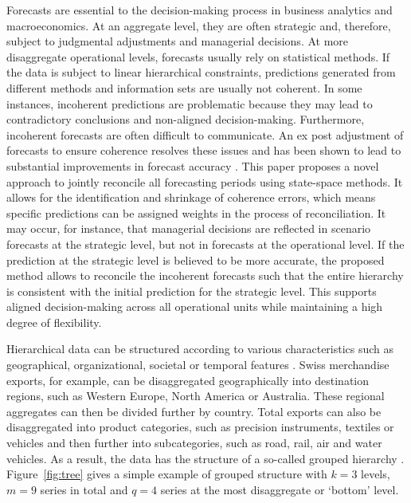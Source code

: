 \documentclass[a4paper,fleqn,11pt]{article}
\begin{document}
Forecasts are essential to the decision-making process in business analytics and macroeconomics. At an aggregate level, they are often strategic and, therefore, subject to judgmental adjustments and managerial decisions. At more disaggregate operational levels, forecasts usually rely on statistical methods. If the data is subject to linear hierarchical constraints, predictions generated from different methods and information sets are usually not coherent. In some instances, incoherent predictions are problematic because they may lead to contradictory conclusions and non-aligned decision-making. Furthermore, incoherent forecasts are often difficult to communicate. An ex post adjustment of forecasts to ensure coherence resolves these issues and has been shown to lead to substantial improvements in forecast accuracy \citep[see][and references therein]{Wickramasuriya2015}. This paper proposes a novel approach to jointly reconcile all forecasting periods using state-space methods. It allows for the identification and shrinkage of coherence errors, which means specific predictions can be assigned weights in the process of reconciliation. It may occur, for instance, that managerial decisions are reflected in scenario forecasts at the strategic level, but not in forecasts at the operational level. If the prediction at the strategic level is believed to be more accurate, the proposed method allows to reconcile the incoherent forecasts such that the entire hierarchy is consistent with the initial prediction for the strategic level. This supports aligned decision-making across all operational units while maintaining a high degree of flexibility.

Hierarchical data can be structured according to various characteristics such as geographical, organizational, societal or temporal features \citep{Kourentzes2019}. Swiss merchandise exports, for example, can be disaggregated geographically into destination regions, such as Western Europe, North America or Australia. These regional aggregates can then be divided further by country. Total exports can also be disaggregated into product categories, such as precision instruments, textiles or vehicles and then further into subcategories, such as road, rail, air and water vehicles. As a result, the data has the structure of a so-called grouped hierarchy \citep[see][and references therein]{Hyndman2018}. Figure~\ref{fig:tree} gives a simple example of grouped structure with $k = 3$ levels, $m = 9$ series in total and $q = 4$ series at the most disaggregate or `bottom' level. 
\end{document}
